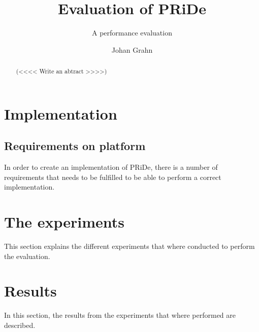 \documentclass[MSc, ida]{histhesis}
\title{Evaluation of PRiDe}
\subtitle{A performance evaluation}
\author{Johan Grahn}
\begin{document}
\maketitle
\begin{abstract}

(<<<< Write an abtract >>>>)

\end{abstract}
\tableofcontents
\thispagestyle{plain}
\listoftables
\newpage

\newpage

\newpage

\newpage

\newpage

\newpage

\newpage

\section{Implementation} %
\label{sec:implementation}




\subsection{Requirements on platform} %
\label{sub:s}

In order to create an implementation of PRiDe, there is a number of requirements that needs to be fulfilled to be able to perform a correct implementation.




\section{The experiments} %
\label{sec:the_experiments}

This section explains the different experiments that where conducted to perform the evaluation. 

\section{Results} %
\label{sec:results}

In this section, the results from the experiments that where performed are described. 
\end{document}
